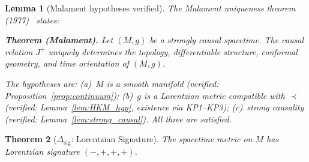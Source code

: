 \documentclass[11pt,a4paper]{article}
\newtheorem{theorem}{Theorem}[section]
\newtheorem{lemma}[theorem]{Lemma}
\theoremstyle{definition}
\begin{document}
\begin{lemma}[Malament hypotheses verified]\label{lem:malament_hyp}
The Malament uniqueness theorem (1977)~\cite{Malament1977} states:

\smallskip\noindent\textbf{Theorem (Malament).}\quad
\textit{Let $(M, g)$ be a strongly causal spacetime.  The causal
relation $J^+$ uniquely determines the topology, differentiable
structure, conformal geometry, and time orientation of $(M, g)$.}

\smallskip\noindent The hypotheses are: (a)~$M$ is a smooth manifold
(verified: Proposition~\ref{prop:continuum}); (b)~$g$ is a Lorentzian
metric compatible with $\prec$ (verified: Lemma~\ref{lem:HKM_hyp},
existence via KP1--KP3); (c)~strong causality (verified:
Lemma~\ref{lem:strong_causal}).  All three are satisfied.
\end{lemma}

\begin{theorem}[$\Delta_{\mathrm{sig}}$: Lorentzian Signature]\label{thm:signature}
The spacetime metric on $M$ has Lorentzian signature $(-,+,+,+)$.
\end{theorem}
\end{document}
